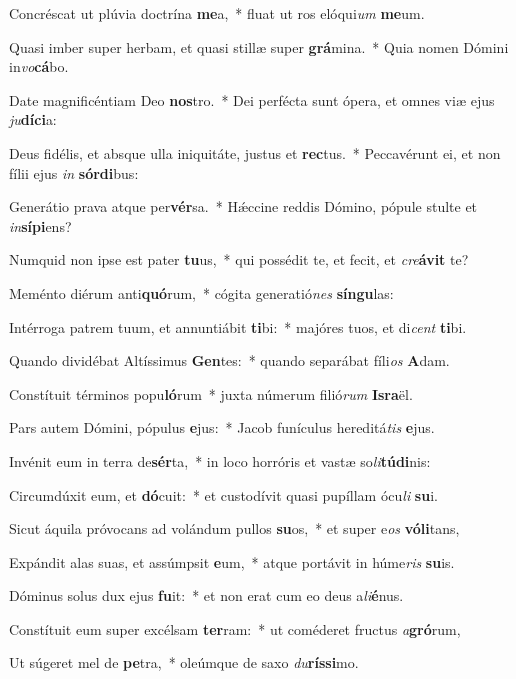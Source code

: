 \item Concréscat ut plúvia doctrína \textbf{me}a,~* fluat ut ros elóqui\textit{um} \textbf{me}um.
\item Quasi imber super herbam, et quasi stillæ super \textbf{grá}mina.~* Quia nomen Dómini in\textit{vo}\textbf{cá}bo.
\item Date magnificéntiam Deo \textbf{nos}tro.~* Dei perfécta sunt ópera, et omnes viæ ejus \textit{ju}\textbf{dí}\textbf{ci}a:
\item Deus fidélis, et absque ulla iniquitáte, justus et \textbf{rec}tus.~* Peccavérunt ei, et non fílii ejus \textit{in} \textbf{sór}\textbf{di}bus:
\item Generátio prava atque per\textbf{vér}sa.~* Hǽccine reddis Dómino, pópule stulte et \textit{in}\textbf{sí}\textbf{pi}ens?
\item Numquid non ipse est pater \textbf{tu}us,~* qui possédit te, et fecit, et \textit{cre}\textbf{á}\textbf{vit} te?
\item Meménto diérum anti\textbf{quó}rum,~* cógita generatió\textit{nes} \textbf{sín}\textbf{gu}las:
\item Intérroga patrem tuum, et annuntiábit \textbf{ti}bi:~* majóres tuos, et di\textit{cent} \textbf{ti}bi.
\item Quando dividébat Altíssimus \textbf{Gen}tes:~* quando separábat fíli\textit{os} \textbf{A}dam.
\item Constítuit términos popu\textbf{ló}rum~* juxta númerum filió\textit{rum} \textbf{Is}\textbf{ra}ël.
\item Pars autem Dómini, pópulus \textbf{e}jus:~* Jacob funículus hereditá\textit{tis} \textbf{e}jus.
\item Invénit eum in terra de\textbf{sér}ta,~* in loco horróris et vastæ so\textit{li}\textbf{tú}\textbf{di}nis:
\item Circumdúxit eum, et \textbf{dó}cuit:~* et custodívit quasi pupíllam ócu\textit{li} \textbf{su}i.
\item Sicut áquila próvocans ad volándum pullos \textbf{su}os,~* et super e\textit{os} \textbf{vó}\textbf{li}tans,
\item Expándit alas suas, et assúmpsit \textbf{e}um,~* atque portávit in húme\textit{ris} \textbf{su}is.
\item Dóminus solus dux ejus \textbf{fu}it:~* et non erat cum eo deus a\textit{li}\textbf{é}nus.
\item Constítuit eum super excélsam \textbf{ter}ram:~* ut coméderet fructus \textit{a}\textbf{gró}rum,
\item Ut súgeret mel de \textbf{pe}tra,~* oleúmque de saxo \textit{du}\textbf{rís}\textbf{si}mo.
